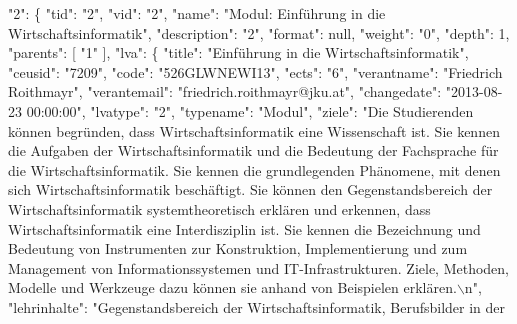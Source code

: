 \begin{DoxyCodeInclude}
            \textcolor{stringliteral}{"2"}: \{
                \textcolor{stringliteral}{"tid"}: \textcolor{stringliteral}{"2"},
                \textcolor{stringliteral}{"vid"}: \textcolor{stringliteral}{"2"},
                \textcolor{stringliteral}{"name"}: \textcolor{stringliteral}{"Modul: Einführung in die Wirtschaftsinformatik"},
                \textcolor{stringliteral}{"description"}: \textcolor{stringliteral}{"2"},
                \textcolor{stringliteral}{"format"}: null,
                \textcolor{stringliteral}{"weight"}: \textcolor{stringliteral}{"0"},
                \textcolor{stringliteral}{"depth"}: 1,
                \textcolor{stringliteral}{"parents"}: [
                    \textcolor{stringliteral}{"1"}
                ],
                \textcolor{stringliteral}{"lva"}: \{
                    \textcolor{stringliteral}{"title"}: \textcolor{stringliteral}{"Einführung in die Wirtschaftsinformatik"},
                    \textcolor{stringliteral}{"ceusid"}: \textcolor{stringliteral}{"7209"},
                    \textcolor{stringliteral}{"code"}: \textcolor{stringliteral}{"526GLWNEWI13"},
                    \textcolor{stringliteral}{"ects"}: \textcolor{stringliteral}{"6"},
                    \textcolor{stringliteral}{"verantname"}: \textcolor{stringliteral}{"Friedrich Roithmayr"},
                    \textcolor{stringliteral}{"verantemail"}: \textcolor{stringliteral}{"friedrich.roithmayr@jku.at"},
                    \textcolor{stringliteral}{"changedate"}: \textcolor{stringliteral}{"2013-08-23 00:00:00"},
                    \textcolor{stringliteral}{"lvatype"}: \textcolor{stringliteral}{"2"},
                    \textcolor{stringliteral}{"typename"}: \textcolor{stringliteral}{"Modul"},
                    \textcolor{stringliteral}{"ziele"}: \textcolor{stringliteral}{"Die Studierenden können begründen, dass Wirtschaftsinformatik eine
       Wissenschaft ist. Sie kennen die Aufgaben der Wirtschaftsinformatik und die Bedeutung der Fachsprache für die
       Wirtschaftsinformatik. Sie kennen die grundlegenden Phänomene, mit denen sich Wirtschaftsinformatik beschäftigt. Sie
       können den Gegenstandsbereich der Wirtschaftsinformatik systemtheoretisch erklären und erkennen, dass
       Wirtschaftsinformatik eine Interdisziplin ist. Sie kennen die Bezeichnung und Bedeutung von Instrumenten zur
       Konstruktion, Implementierung und zum Management von Informationssystemen und IT-Infrastrukturen. Ziele,
       Methoden, Modelle und Werkzeuge dazu können sie anhand von Beispielen erklären.\(\backslash\)n"},
                    \textcolor{stringliteral}{"lehrinhalte"}: \textcolor{stringliteral}{"Gegenstandsbereich der Wirtschaftsinformatik, Berufsbilder in der
}
\end{DoxyCodeInclude}
